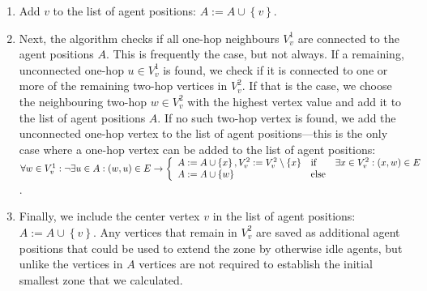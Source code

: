 \begin{enumerate}
  \item Add $v$ to the list of agent positions: $A := A \cup \left\{v\right\}$.
  \item Next, the algorithm checks if all one-hop neighbours $V_v^1$ are connected to the agent positions $A$.
        This is frequently the case, but not always.
        If a remaining, unconnected one-hop $u \in V_v^1$ is found, we check if it is connected to one or more of the remaining two-hop vertices in $V_v^2$.
        If that is the case, we choose the neighbouring two-hop $w \in V_v^2$ with the highest vertex value and add it to the list of agent positions $A$.
        If no such two-hop vertex is found, we add the unconnected one-hop vertex to the list of agent positions---this is the only case where a one-hop vertex can be added to the list of agent positions:$\forall w \in V_v^1: \lnot \exists u \in A: \left(w, u \right ) \in E \rightarrow \left\{\begin{array}{lll}
A := A \cup \left\{x\right\}, V_v^2 := V_v^2 \setminus \left\{x\right\} & \textup{if} & \exists x \in V_v^2: \left(x, w \right ) \in E\\
A := A \cup \left\{w\right\} &\textup{else} &
\end{array}\right.$.
  \item Finally, we include the center vertex $v$ in the list of agent positions: $A := A \cup \left\{v\right\}$.
        Any vertices that remain in $V_v^2$ are saved as additional agent positions that could be used to extend the zone by otherwise idle agents, but unlike the vertices in $A$ vertices are not required to establish the initial smallest zone that we calculated.
\end{enumerate}
